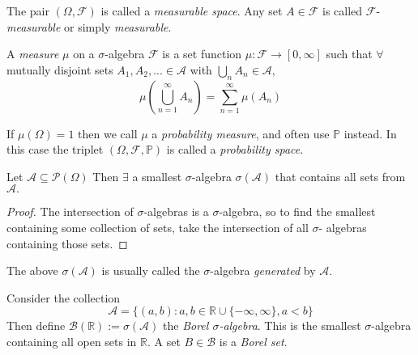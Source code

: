\begin{remark}
    The pair $(\Omega,\mathcal{F})$ is called a \emph{measurable space}. Any set $A\in\mathcal{F}$
    is called $\mathcal{F}$-\emph{measurable} or simply \emph{measurable}.
\end{remark}

\begin{definition}
    A \emph{measure} $\mu$ on a $\sigma$-algebra $\mathcal{F}$ is a set function
    $\mu:\mathcal{F}\rightarrow[0,\infty]$ such that $\forall$ mutually disjoint
    sets $A_1,A_2,...\in\mathcal{A}$ with $\bigcup_nA_n\in\mathcal{A},$
    \begin{equation}
        \mu\left(\bigcup_{n=1}^{\infty}A_n\right)=\sum_{n=1}^{\infty}\mu(A_n)
    \end{equation}
\end{definition}

\begin{remark}
    If $\mu(\Omega)=1$ then we call $\mu$ a \emph{probability measure}, and often
    use $\mathbb{P}$ instead. In this case the triplet $(\Omega,\mathcal{F},\mathbb{P})$
    is called a \emph{probability space}.
\end{remark}

\begin{lemma}
    Let $\mathcal{A}\subseteq\mathcal{P}(\Omega)$ Then $\exists$ a smallest $\sigma$-algebra 
    $\sigma(\mathcal{A})$ that contains all sets from $\mathcal{A}.$
\end{lemma}
\begin{proof}
    The intersection of $\sigma$-algebras is a $\sigma$-algebra, so to find the 
    smallest containing some collection of sets, take the intersection of all $\sigma$-
    algebras containing those sets.
\end{proof}

\begin{remark}
    The above $\sigma(\mathcal{A})$ is usually called the $\sigma$-algebra
    \emph{generated} by $\mathcal{A}$.
\end{remark}

\begin{definition}
    Consider the collection 
    \begin{equation*}
        \mathcal{A}=\{(a,b):a,b\in\mathbb{R}\cup\{-\infty,\infty\},a<b\}
    \end{equation*}
    Then define $\mathcal{B}(\mathbb{R}):=\sigma(\mathcal{A})$ the \emph{Borel 
    $\sigma$-algebra}. This is the smallest $\sigma$-algebra containing all open
    sets in $\mathbb{R}$. A set $B\in\mathcal{B}$ is a \emph{Borel set}.
\end{definition}

